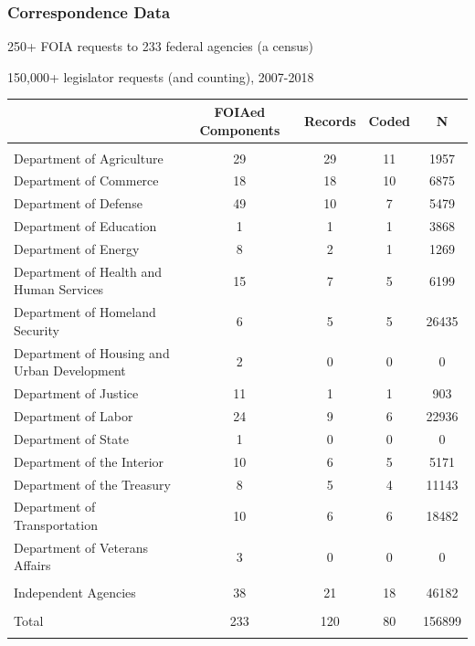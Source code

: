 \documentclass[10pt]{beamer}
\begin{document}
\begin{frame}
\frametitle{Correspondence Data}
\Large
250+ FOIA requests to 233 federal agencies (a census)

150,000+ legislator requests (and counting), 2007-2018
 


\scriptsize
\begin{table}[!htbp] \centering 
  \label{} 
\begin{tabular}{@{\extracolsep{5pt}} lcccc} 
 & FOIAed Components & Records & Coded & N \\ 
\hline \\[-1.8ex] 
Department of Agriculture & 29 & 29 & 11 & 1957 \\ 
Department of Commerce & 18 & 18 & 10 & 6875 \\ 
Department of Defense & 49 & 10 & 7 & 5479 \\ 
Department of Education & 1 & 1 & 1 & 3868 \\ 
Department of Energy & 8 & 2 & 1 & 1269 \\ 
Department of Health and Human Services & 15 & 7 & 5 & 6199 \\ 
Department of Homeland Security & 6 & 5 & 5 & 26435 \\ 
Department of Housing and Urban Development & 2 & 0 & 0 & 0 \\ 
Department of Justice & 11 & 1 & 1 & 903 \\ 
Department of Labor & 24 & 9 & 6 & 22936 \\ 
Department of State & 1 & 0 & 0 & 0 \\ 
Department of the Interior & 10 & 6 & 5 & 5171 \\ 
Department of the Treasury & 8 & 5 & 4 & 11143 \\ 
Department of Transportation & 10 & 6 & 6 & 18482 \\ 
Department of Veterans Affairs & 3 & 0 & 0 & 0 \\ 
\hline \\[-1.8ex] 
Independent Agencies & 38 & 21 & 18 & 46182 \\ 
\hline \\[-1.8ex] 
Total & 233 & 120 & 80 & 156899 \\ 
\hline \\[-1.8ex] 
\end{tabular} 
\end{table} 


\end{frame}
\end{document}
